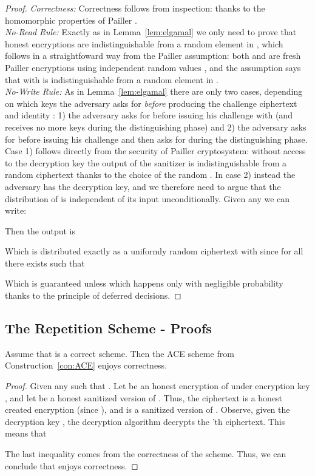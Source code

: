 \documentclass{llncs}
\begin{document}
\begin{proof} \emph{Correctness:} Correctness follows from inspection: thanks to the homomorphic properties of Pailler . \\

\noindent \emph{No-Read Rule:} Exactly as in Lemma~\ref{lem:elgamal} we only need to prove that honest encryptions are indistinguishable from a random element in , which follows in a straightfoward way from the Pailler assumption: both  and  are fresh Pailler encryptions using independent random values , and the assumption says that  with  is indistinguishable from a random element in . \\

\noindent \emph{No-Write Rule:} As in Lemma~\ref{lem:elgamal} there are only two cases, depending on which keys the adversary asks for \emph{before} producing the challenge ciphertext  and identity : 1) the adversary asks for  before issuing his challenge  with  (and receives no more keys during the distinguishing phase) and 2) the adversary asks for  before issuing his challenge  and then asks for  during the distinguishing phase. Case 1) follows directly from the security of Pailler cryptosystem: without access to the decryption key the output of the sanitizer is indistinguishable from a random ciphertext thanks to the choice of the random . In case 2) instead the adversary has the decryption key, and we therefore need to argue that the distribution of  is independent of its input unconditionally. Given any  we can write:

Then the output  is

Which is distributed exactly as a uniformly random ciphertext  with  since for all  there exists  such that 

Which is guaranteed unless  which happens only with negligible probability thanks to the principle of deferred decisions.
\end{proof}




\subsection{The Repetition Scheme - Proofs}\label{app:repetitionproofs}


\begin{lem}
Assume that  is a correct \oACE scheme.
Then the ACE scheme  from Construction~\ref{con:ACE} enjoys correctness.
\end{lem}

\begin{proof}
Given any  such that .
Let  be an honest encryption of  under encryption key , and let  be a honest sanitized version of .
Thus, the ciphertext  is a honest created \oACE encryption (since ), and  is a sanitized version of . 
Observe, given the decryption key , the decryption algorithm  decrypts the 'th  ciphertext.
This means that


The last inequality comes from the correctness of the \oACE scheme.
Thus, we can conclude that  enjoys correctness.
\end{proof}
\end{document}
